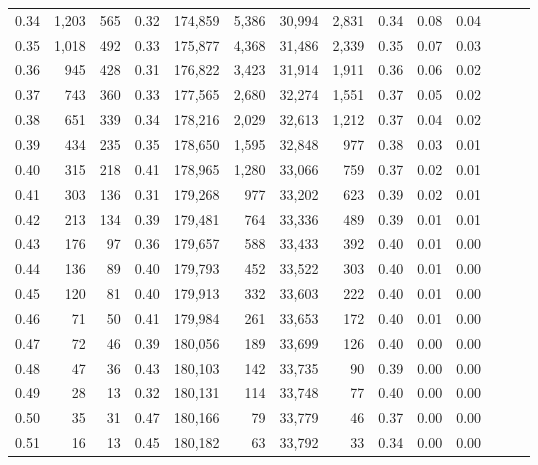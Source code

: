 \begin{tabular}{rrrrrrrrrrrrrr}
0.34 &   1,203 &    565 &  0.32 &  174,859 &    5,386 &  30,994 &   2,831 &  0.34 &  0.08 &      0.04 \\
0.35 &   1,018 &    492 &  0.33 &  175,877 &    4,368 &  31,486 &   2,339 &  0.35 &  0.07 &      0.03 \\
0.36 &     945 &    428 &  0.31 &  176,822 &    3,423 &  31,914 &   1,911 &  0.36 &  0.06 &      0.02 \\
0.37 &     743 &    360 &  0.33 &  177,565 &    2,680 &  32,274 &   1,551 &  0.37 &  0.05 &      0.02 \\
0.38 &     651 &    339 &  0.34 &  178,216 &    2,029 &  32,613 &   1,212 &  0.37 &  0.04 &      0.02 \\
0.39 &     434 &    235 &  0.35 &  178,650 &    1,595 &  32,848 &     977 &  0.38 &  0.03 &      0.01 \\
0.40 &     315 &    218 &  0.41 &  178,965 &    1,280 &  33,066 &     759 &  0.37 &  0.02 &      0.01 \\
0.41 &     303 &    136 &  0.31 &  179,268 &      977 &  33,202 &     623 &  0.39 &  0.02 &      0.01 \\
0.42 &     213 &    134 &  0.39 &  179,481 &      764 &  33,336 &     489 &  0.39 &  0.01 &      0.01 \\
0.43 &     176 &     97 &  0.36 &  179,657 &      588 &  33,433 &     392 &  0.40 &  0.01 &      0.00 \\
0.44 &     136 &     89 &  0.40 &  179,793 &      452 &  33,522 &     303 &  0.40 &  0.01 &      0.00 \\
0.45 &     120 &     81 &  0.40 &  179,913 &      332 &  33,603 &     222 &  0.40 &  0.01 &      0.00 \\
0.46 &      71 &     50 &  0.41 &  179,984 &      261 &  33,653 &     172 &  0.40 &  0.01 &      0.00 \\
0.47 &      72 &     46 &  0.39 &  180,056 &      189 &  33,699 &     126 &  0.40 &  0.00 &      0.00 \\
0.48 &      47 &     36 &  0.43 &  180,103 &      142 &  33,735 &      90 &  0.39 &  0.00 &      0.00 \\
0.49 &      28 &     13 &  0.32 &  180,131 &      114 &  33,748 &      77 &  0.40 &  0.00 &      0.00 \\
0.50 &      35 &     31 &  0.47 &  180,166 &       79 &  33,779 &      46 &  0.37 &  0.00 &      0.00 \\
0.51 &      16 &     13 &  0.45 &  180,182 &       63 &  33,792 &      33 &  0.34 &  0.00 &      0.00 \\

\end{tabular}
